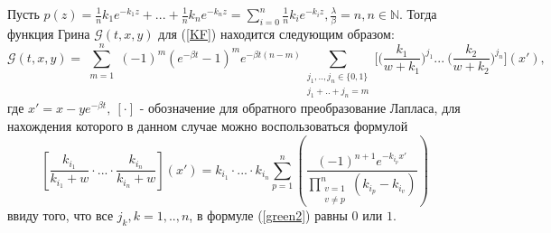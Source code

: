 \begin{theorem}
 Пусть $p(z)=\frac{1}{n} k_1 e^{-k_1 z} +...
 +\frac{1}{n} k_n e^{-k_n z}=
 \sum\limits_{i=0}^{n}\frac{1}{n} k_i e^{-k_i z},
 \frac{\lambda}{\beta} = n, n \in \mathbb{N}.$
 Тогда функция Грина $\mathcal{G}(t,x,y)$ для (\ref{KF}) находится следующим образом:
\begin{equation} \label{green2}
    \mathcal{G}(t,x,y) = \sum\limits_{\substack{m=1}}^{n}
(-1)^m (e^{-\beta t}-1)^m e^{-\beta t (n-m)}
\sum\limits_{\substack{j_1,..,j_n \in \{ 0,1 \}\\
j_1+..+j_n=m}}^{}
\Big[\Big(\frac{k_1}{w+k_1}\Big)^{j_1} ...  \ \Big(\frac{k_2}{w+k_2}\Big)^{j_n} \Big](x'),
\end{equation}
где $x'=x-y e^{-\beta t},\ [\cdot]$ - обозначение для обратного преобразование Лапласа, для нахождения которого в данном случае можно воспользоваться формулой
\begin{equation} \label{inv2}
    \left[   \frac{k_{i_1}}{k_{i_1}+w}\cdot...
    \cdot \frac{k_{i_n}}{k_{i_n}+w}
    \right](x')=
    k_{i_1}\cdot...\cdot k_{i_n}
    \sum\limits_{p=1}^{n} \left(
    \frac{(-1)^{n+1}e^{-k_{i_p}x'}}
    {\prod\limits_{\substack{v=1\\v\ne p}}^{n}
    (k_{i_p}-k_{i_v})} \right)
\end{equation}
ввиду того, что все $j_k, k=1,..,n$, в формуле (\ref{green2}) равны $0$ или $1$.
\end{theorem}





%




